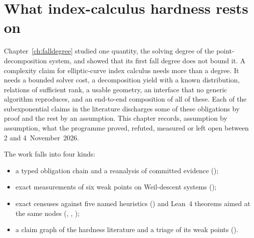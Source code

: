 \chapter{What index-calculus hardness rests on}\label{ch:hardness}

Chapter~\ref{ch:falldegree} studied one quantity, the solving degree of the
point-decomposition system, and showed that its first fall degree does not
bound it. A complexity claim for elliptic-curve index calculus needs more
than a degree. It needs a bounded solver cost, a decomposition yield with a
known distribution, relations of sufficient rank, a usable geometry, an
interface that no generic algorithm reproduces, and an end-to-end
composition of all of these. Each of the subexponential claims in the
literature discharges some of these obligations by proof and the rest by an
assumption. This chapter records, assumption by assumption, what the
programme proved, refuted, measured or left open between 2 and
4~November~2026.

The work falls into four kinds:
\begin{itemize}
\item a typed obligation chain and a reanalysis of committed evidence
  ();
\item exact measurements of six weak points on Weil-descent systems
  ();
\item exact censuses against five named heuristics
  () and Lean~4 theorems
  aimed at the same nodes (,
  ,
  );
\item a claim graph of the hardness literature and a triage of its weak
  points ().
\end{itemize}


